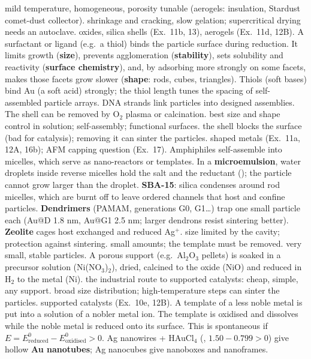 {mild temperature, homogeneous, porosity tunable (aerogels: insulation, Stardust comet-dust collector).}
{shrinkage and cracking, slow gelation; supercritical drying needs an autoclave.}
{oxides, silica shells (Ex.~11b, 13), aerogels (Ex.~11d, 12B).}
{A surfactant or ligand (e.g.\ a thiol) binds the particle surface during reduction. It limits growth (\textbf{size}), prevents
agglomeration (\textbf{stability}), sets solubility and reactivity (\textbf{surface chemistry}), and, by adsorbing more strongly on some
facets, makes those facets grow slower (\textbf{shape}: rods, cubes, triangles). Thiols (soft bases) bind Au (a soft acid) strongly;
the thiol length tunes the spacing of self-assembled particle arrays. DNA strands link particles into designed assemblies. The shell can
be removed by O$_2$ plasma or calcination.}
{best size and shape control in solution; self-assembly; functional surfaces.}
{the shell blocks the surface (bad for catalysis); removing it can sinter the particles.}
{shaped metals (Ex.~11a, 12A, 16b); AFM capping question (Ex.~17).}
{Amphiphiles self-assemble into micelles, which serve as nano-reactors or templates. In a \textbf{microemulsion}, water droplets
inside reverse micelles hold the salt and the reductant (); the particle cannot grow
larger than the droplet. \textbf{SBA-15}: silica condenses around rod micelles, which are burnt off to leave ordered channels that
host and confine particles. \textbf{Dendrimers} (PAMAM, generations G0, G1\ldots) trap one small particle each (Au@D 1.8 nm,
Au@G1 2.5 nm; larger dendrons resist sintering better). \textbf{Zeolite} cages host exchanged and reduced Ag$^+$.}
{size limited by the cavity; protection against sintering.}
{small amounts; the template must be removed.}
{very small, stable particles.}
{A porous support (e.g.\ Al$_2$O$_3$ pellets) is soaked in a precursor solution (Ni(NO$_3$)$_2$), dried, calcined to the oxide (NiO)
and reduced in H$_2$ to the metal (Ni).}
{the industrial route to supported catalysts: cheap, simple, any support.}
{broad size distribution; high-temperature steps can sinter the particles.}
{supported catalysts (Ex.~10e, 12B).}
{A template of a less noble metal is put into a solution of a nobler metal ion. The template is oxidised and dissolves while the noble
metal is reduced onto its surface. This is spontaneous if $E = E^0_\mathrm{reduced} - E^0_\mathrm{oxidised} > 0$. Ag nanowires +
HAuCl$_4$ (, $1.50-0.799>0$) give hollow \textbf{Au nanotubes}; Ag nanocubes give nanoboxes and
nanoframes.}

